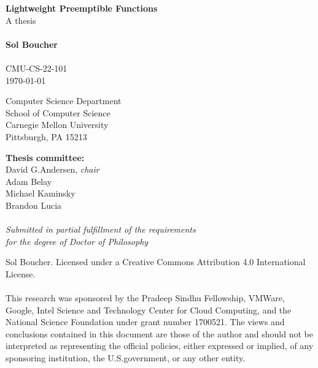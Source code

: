 \documentclass[12pt,letterpaper]{book}
\makeatletter
\let\label@\label
\makeatother
\begin{document}
\makeatletter
\let\label@\label
\let\ref@\ref
\newenvironment{namespacereferences}[1]{
	\renewcommand{\label}[1]{\label@{#1##1}}
	\renewcommand{\ref}[1]{\ref@{#1##1}}
}{
	\let\label\label@
	\let\ref\ref@
}
\makeatother

\frontmatter

\begin{titlepage}
\begin{center}
	\vspace*{\fill}

	\textbf{\Large Lightweight Preemptible Functions} \\
	A thesis \\
	\hfill \\
	\textbf{\large Sol Boucher} \\
	\hfill \\
	CMU-CS-22-101 \\
	\today \\

	\vspace{\fill}

	Computer Science Department \\
	School of Computer Science \\
	Carnegie Mellon University \\
	Pittsburgh, PA 15213 \\

	\vspace{\fill}

	\textbf{Thesis committee:} \\
	David G.\@ Andersen, \textit{chair} \\
	Adam Belay \\
	Michael Kaminsky \\
	Brandon Lucia \\
	\hfill \\
	\textit{Submitted in partial fulfillment of the requirements \\
	for the degree of Doctor of Philosophy} \\

	\vspace{\fill}

	\textcopyright \the\year{} Sol Boucher.
	Licensed under a Creative Commons Attribution 4.0 International License. \\
	\hfill \\
	This research was sponsored by the Pradeep Sindhu Fellowship, VMWare, Google,
	Intel Science and Technology Center for Cloud Computing, and the National
	Science Foundation under grant number 1700521.  The views and conclusions
	contained in this document are those of the author and should not be
	interpreted as representing the official policies, either expressed or
	implied, of any sponsoring institution, the U.S.\@ government, or any other
	entity.
\end{center}
\end{titlepage}
\end{document}
